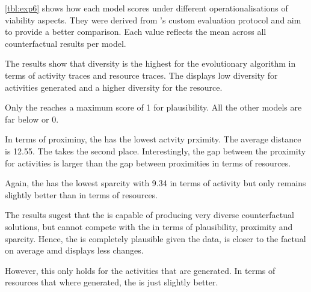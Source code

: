 \documentclass[./../../paper.tex]{subfiles}
\begin{document}
\autoref{tbl:exp6} shows how each model scores under different operationalisations of viability aspects. They were derived from \citeauthor{hsieh_DiCE4ELInterpretingProcess_2021}'s custom evaluation protocol and aim to provide a better comparison. Each value reflects the mean across all counterfactual results per model.



The results show that diversity is the highest for the evolutionary algorithm in terms of activity traces and resource traces. The \ModelRNG displays low diversity for activities generated and a higher diversity for the resource. 

Only the \ModelCBG reaches a maximum score of 1 for plausibility. All the other models are far below or 0. 

In terms of proximiny, the \ModelCBG has the lowest actvity prximity. The average distance is 12.55. The \ModelEVOFSR takes the second place. Interestingly, the gap between the proximity for activities is larger than the gap between proximities in terms of resources.

Again, the \ModelCBG has the lowest sparcity with 9.34 in terms of activity but only remains slightly better than \ModelEVOFSR in terms of resources. 

The results sugest that the \ModelEVOFSR is capable of producing very diverse counterfactual solutions, but cannot compete with the \ModelCBG in terms of plausibility, proximity and sparcity. Hence, the \ModelCBG is completely plausible given the data, is closer to the factual on average amd displays less changes.

However, this only holds for the activities that are generated.  In terms of resources that where generated, the \ModelCBG is just slightly better.
\end{document}
